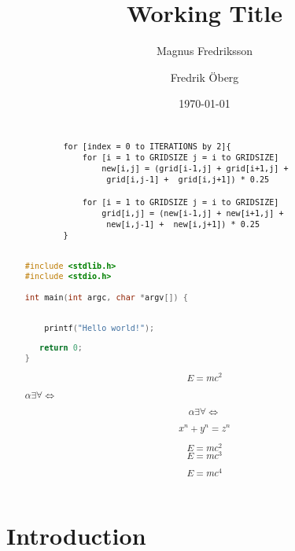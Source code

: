 \documentclass{article}
\begin{document}
\title{Working Title}
\author{Magnus Fredriksson}
\author{Fredrik Öberg}
\date{\today}
\maketitle

\begin{abstract}

\begin{verbatim}

        for [index = 0 to ITERATIONS by 2]{
            for [i = 1 to GRIDSIZE j = i to GRIDSIZE]
                new[i,j] = (grid[i-1,j] + grid[i+1,j] +
                 grid[i,j-1] +  grid[i,j+1]) * 0.25
	
            for [i = 1 to GRIDSIZE j = i to GRIDSIZE]
                grid[i,j] = (new[i-1,j] + new[i+1,j] + 
                 new[i,j-1] +  new[i,j+1]) * 0.25
        }

\end{verbatim}

\begin{lstlisting}[language=C]

#include <stdlib.h>
#include <stdio.h>

int main(int argc, char *argv[]) {

  
    printf("Hello world!");
   
   return 0;
}

\end{lstlisting}

\begin{displaymath} 
	E = {mc^2} 
\end{displaymath}


$\alpha \exists \forall  \Leftrightarrow$

\[\alpha \exists \forall  \Leftrightarrow\]

\[ x^n + y^n = z^n \]

\[E = {mc^2} \]
\begin{equation}
E=mc^3
\end{equation}

\begin{equation}
E=mc^4
\end{equation}

\end{abstract}

\newpage
\tableofcontents
\newpage

\section{Introduction}
\end{document}
